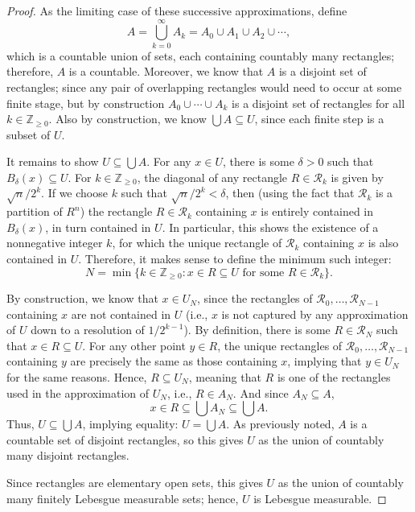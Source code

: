 \documentclass[12pt]{article}
\newcommand{\Z}{\mathbb{Z}}
\newcommand{\<}{\langle}
\renewcommand{\>}{\rangle}
\newcommand{\RR}{\mathcal{R}}
\begin{document}
\begin{proof}
    As the limiting case of these successive approximations, define
    \[
        A = \bigcup_{k = 0}^{\infty} A_k = A_0 \cup A_1 \cup A_2 \cup \cdots,
    \]
    which is a countable union of sets, each containing countably many rectangles; therefore, $A$ is a countable. Moreover, we know that $A$ is a disjoint set of rectangles; since any pair of overlapping rectangles would need to occur at some finite stage, but by construction $A_0 \cup \cdots \cup A_k$ is a disjoint set of rectangles for all $k \in \Z_{\geq0}$. Also by construction, we know $\bigcup A \subseteq U$, since each finite step is a subset of $U$.


    It remains to show $U \subseteq \bigcup A$. For any $x \in U$, there is some $\delta > 0$ such that $B_\delta(x) \subseteq U$. For $k \in \Z_{\geq0}$, the diagonal of any rectangle $R \in \RR_k$ is given by $\sqrt{n}/2^k$. If we choose $k$ such that $\sqrt{n}/2^k < \delta$, then (using the fact that $\RR_k$ is a partition of $R^n$) the rectangle $R \in \RR_k$ containing $x$ is entirely contained in $B_\delta(x)$, in turn contained in $U$. In particular, this shows the existence of a nonnegative integer $k$, for which the unique rectangle of $\RR_k$ containing $x$ is also contained in $U$. Therefore, it makes sense to define the minimum such integer:
    \[
        N = \min\{k \in \Z_{\geq0} : x \in R \subseteq U \text{ for some } R \in \RR_k\}.
    \]

    By construction, we know that $x \in U_N$, since the rectangles of $\RR_0, \dots, \RR_{N-1}$ containing $x$ are not contained in $U$ (i.e., $x$ is not captured by any approximation of $U$ down to a resolution of $1/2^{k-1}$). By definition, there is some $R \in \RR_N$ such that $x \in R \subseteq U$. For any other point $y \in R$, the unique rectangles of $\RR_0, \dots, \RR_{N-1}$ containing $y$ are precisely the same as those containing $x$, implying that $y \in U_N$ for the same reasons. Hence, $R \subseteq U_N$, meaning that $R$ is one of the rectangles used in the approximation of $U_N$, i.e., $R \in A_N$. And since $A_N \subseteq A$,
    \[
        x \in R \subseteq \textstyle\bigcup A_N \subseteq \bigcup A.
    \]
    Thus, $U \subseteq \bigcup A$, implying equality: $U = \bigcup A$. As previously noted, $A$ is a countable set of disjoint rectangles, so this gives $U$ as the union of countably many disjoint rectangles.

    Since rectangles are elementary open sets, this gives $U$ as the union of countably many finitely Lebesgue measurable sets; hence, $U$ is Lebesgue measurable.

\end{proof}
\end{document}
